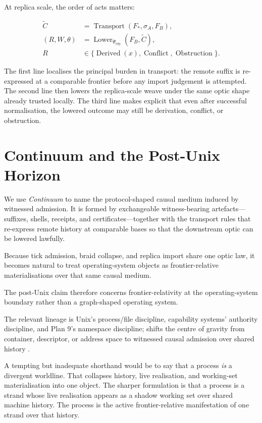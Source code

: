 \documentclass{aion}
\begin{document}
	At replica scale, the order of acts matters:

\[
	\begin{aligned}
		\widetilde{C}
		 & =
		\operatorname{Transport}(F_*, \sigma_A, F_B),                   \\
		(R, W, \theta)
		 & =
		\operatorname{Lower}_{\Psi_{\mathrm{rep}}}(F_B, \widetilde{C}), \\
		R
		 & \in
		\{\operatorname{Derived}(x), \operatorname{Conflict}, \operatorname{Obstruction}\}.
	\end{aligned}
\]

The first line localises the principal burden in transport: the remote suffix is
re-expressed at a comparable frontier before any import judgement is attempted.
The second line then lowers the replica-scale weave under
the same optic shape already trusted locally. The third line makes explicit
that even after successful normalisation, the lowered outcome may still be
derivation, conflict, or obstruction.

\clearpage
\section{Continuum and the Post-Unix Horizon}
\label{sec:continuum}

We use \emph{Continuum} to name the protocol-shaped causal medium induced by
witnessed admission. It is formed by exchangeable witness-bearing
artefacts---suffixes, shells, receipts, and certificates---together with the
transport rules that re-express remote history at comparable bases so that the
downstream optic can be lowered lawfully.

Because tick admission, braid collapse, and replica import share one optic law,
it becomes natural to treat operating-system objects as frontier-relative
materialisations over that same causal medium.

The post-Unix claim therefore concerns frontier-relativity at the operating-system boundary rather than a graph-shaped operating system.

The relevant lineage is Unix's process/file discipline, capability systems' authority discipline, and Plan 9's namespace discipline; \WARP{} shifts the centre of gravity from container, descriptor, or address space to witnessed causal admission over shared history \cite{RitchieThompson1974,DennisVanHorn1966,Levy1984,Pike1995}.

A tempting but inadequate shorthand would be to say that a process
\emph{is} a divergent worldline. That collapses history, live realisation, and
working-set materialisation into one object. The sharper formulation is that a
process is a strand whose live realisation appears as a shadow working set over
shared machine history. The process is the active frontier-relative
manifestation of one strand over that history.
\end{document}
